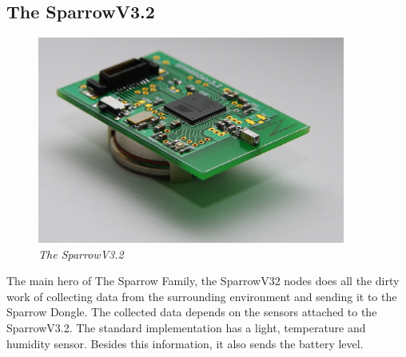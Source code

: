 \subsection{The SparrowV3.2}

\begin{figure}[ht]
\begin{center}
\includegraphics[width=0.9\textwidth]{hw_platform/Sparrowv32.jpg}
\end{center}
\caption{\small \itshape{The SparrowV3.2}}
\end{figure}

The main hero of The Sparrow Family, the SparrowV32 nodes does all the dirty work of collecting data from the surrounding environment and sending it to the Sparrow Dongle. The collected data depends on the sensors attached to the SparrowV3.2. The standard implementation has a light, temperature and humidity sensor. Besides this information, it also sends the battery level.
